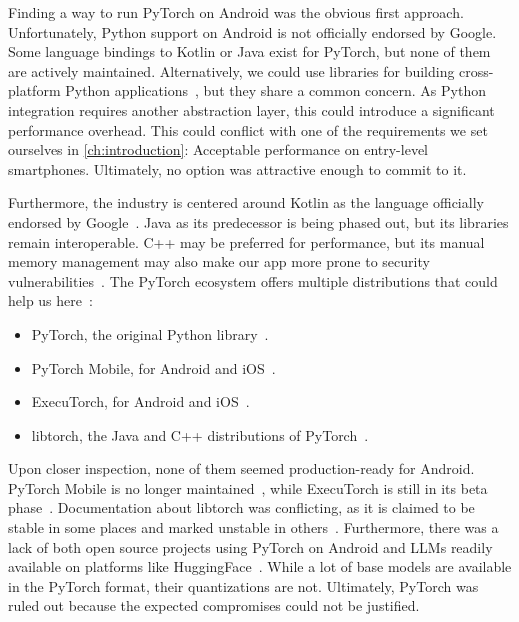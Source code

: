 Finding a way to run PyTorch on Android was the obvious first approach. Unfortunately, Python support on Android is not officially endorsed by Google. Some language bindings to Kotlin or Java exist for PyTorch, but none of them are actively maintained. Alternatively, we could use libraries for building cross-platform Python applications~\cite{kivyKivyKivy2025}, but they share a common concern. As Python integration requires another abstraction layer, this could introduce a significant performance overhead. This could conflict with one of the requirements we set ourselves in \cref{ch:introduction}: Acceptable performance on entry-level smartphones. Ultimately, no option was attractive enough to commit to it.

Furthermore, the industry is centered around Kotlin as the language officially endorsed by Google~\cite{ruggiaDarkSideNative2025}. Java as its predecessor is being phased out, but its libraries remain interoperable. C++ may be preferred for performance, but its manual memory management may also make our app more prone to security vulnerabilities~\cite{ruggiaDarkSideNative2025}. The PyTorch ecosystem offers multiple distributions that could help us here~\cite{pytorchPyTorch}:
\begin{itemize}
	\item PyTorch, the original Python library~\cite{anselPyTorch2Faster2024}.
	\item PyTorch Mobile, for Android and iOS~\cite{pytorchPytorchAndroiddemoapp2025}.
	\item ExecuTorch, for Android and iOS~\cite{pytorchPytorchExecutorch2025}.
	\item libtorch, the Java and C++ distributions of PyTorch~\cite{pytorchStartLocally,pytorchPyTorchAPIPyTorch}.
\end{itemize}

Upon closer inspection, none of them seemed production-ready for Android. PyTorch Mobile is no longer maintained~\cite{pytorchPytorchAndroiddemoapp2025}, while ExecuTorch is still in its beta phase~\cite{pytorchPytorchExecutorch2025}. Documentation about libtorch was conflicting, as it is claimed to be stable in some places and marked unstable in others~\cite{pytorchStartLocally,pytorchPyTorchAPIPyTorch}. Furthermore, there was a lack of both open source projects using PyTorch on Android and \glspl{LLM} readily available on platforms like HuggingFace~\cite{huggingfaceModelsHuggingFace2025}. While a lot of base models are available in the PyTorch format, their quantizations are not. Ultimately, PyTorch was ruled out because the expected compromises could not be justified.

